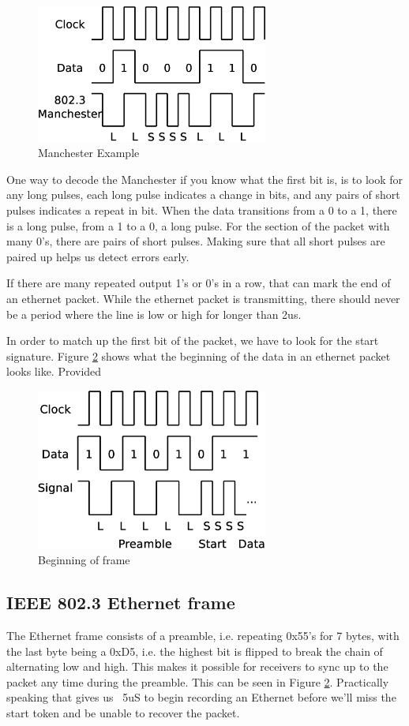 \documentclass{article}
\begin{document}
\begin{figure}
    \centering
    \includegraphics[width=3.0in]{manchester}
    \caption{Manchester Example}
    \label{manchester}
\end{figure}

One way to decode the Manchester if you know what the first bit is, is to look for any long pulses, 
each long pulse indicates a change in bits, and any pairs of short pulses indicates a repeat in bit. 
When the data transitions from a 0 to a 1, there is a long pulse, from a 1 to a 0, a long pulse. For
the section of the packet with many 0's, there are pairs of short pulses.  Making sure that all
short pulses are paired up helps us detect errors early. 

If there are many repeated output 1's or 0's in a row, that can mark the end of an ethernet packet.
While the ethernet packet is transmitting, there should never be a period where the line is low
or high for longer than 2us.

In order to match up the first bit of the packet, we have to look for the start signature.
Figure \ref{manchesterb} shows what the beginning of the data in an ethernet packet looks like.
Provided 

\begin{figure}
    \centering
    \includegraphics[width=3.0in]{manchesterb}
    \caption{Beginning of frame}
    \label{manchesterb}
\end{figure}


\subsection{IEEE 802.3 Ethernet frame}
The Ethernet frame consists of a preamble, i.e. repeating 0x55's for 7 bytes, with the last
byte being a 0xD5, i.e. the highest bit is flipped to break the chain of alternating low
and high.  This makes it possible for receivers to sync up to the packet any time during the
preamble.  This can be seen in Figure \ref{manchesterb}.  Practically speaking that gives us ~5uS to begin recording an Ethernet 
before we'll miss the start token and be unable to recover the packet.
\end{document}
